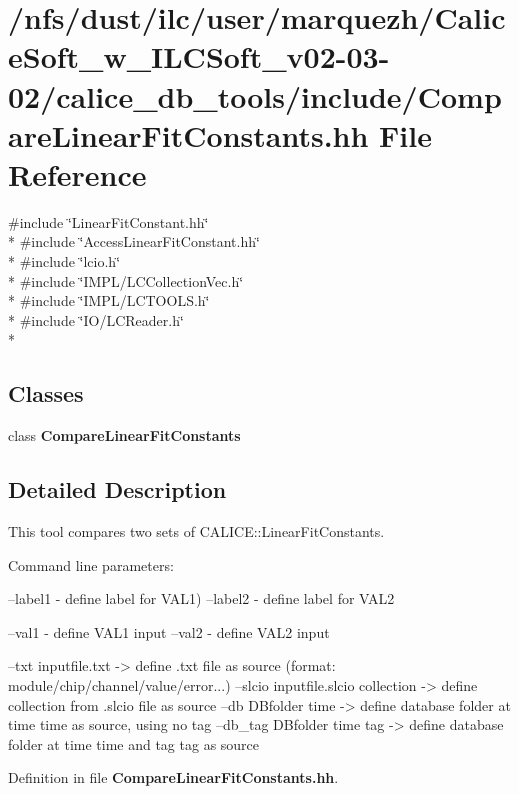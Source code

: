 \section{/nfs/dust/ilc/user/marquezh/\-Calice\-Soft\-\_\-w\-\_\-\-I\-L\-C\-Soft\-\_\-v02-\/03-\/02/calice\-\_\-db\-\_\-tools/include/\-Compare\-Linear\-Fit\-Constants.hh File Reference}
\label{include_2CompareLinearFitConstants_8hh}
{\ttfamily \#include \char`\"{}Linear\-Fit\-Constant.\-hh\char`\"{}}\\*
{\ttfamily \#include \char`\"{}Access\-Linear\-Fit\-Constant.\-hh\char`\"{}}\\*
{\ttfamily \#include \char`\"{}lcio.\-h\char`\"{}}\\*
{\ttfamily \#include \char`\"{}I\-M\-P\-L/\-L\-C\-Collection\-Vec.\-h\char`\"{}}\\*
{\ttfamily \#include \char`\"{}I\-M\-P\-L/\-L\-C\-T\-O\-O\-L\-S.\-h\char`\"{}}\\*
{\ttfamily \#include \char`\"{}I\-O/\-L\-C\-Reader.\-h\char`\"{}}\\*
\subsection*{Classes}
\begin{DoxyCompactItemize}
\item 
class {\bf Compare\-Linear\-Fit\-Constants}
\end{DoxyCompactItemize}


\subsection{Detailed Description}
This tool compares two sets of C\-A\-L\-I\-C\-E\-::\-Linear\-Fit\-Constants.

Command line parameters\-: \begin{DoxyVerb}\e --label1  -\> define label for VAL1) \n
\e --label2  -\> define label for VAL2 \n

\e --val1     -\> define VAL1 input \n
\e --val2     -\> define VAL2 input \n

\e --txt \<inputfile.txt\>                      -> define .txt file as source (format: module/chip/channel/value/error...) \n
\e --slcio \<inputfile.slcio\> \<collection\>   -> define collection from .slcio file as source \n
\e --db \<DBfolder\> \<time\>                   -> define database folder at time \<time\> as source, using no tag \n
\e --db_tag \<DBfolder\> \<time\> \<tag\>       -> define database folder at time \<time\> and tag \<tag\> as source \n\end{DoxyVerb}


Definition in file {\bf Compare\-Linear\-Fit\-Constants.\-hh}.

